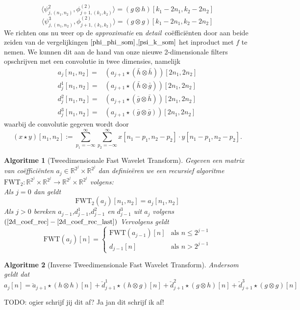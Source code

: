 \documentclass[11pt]{report}
\newcommand{\R}{\mathbb{R}}
\theoremstyle{plain}
\newtheorem*{algo}{Algoritme}
\theoremstyle{remark}
\newcommand{\inpr}[2]{\langle #1 , #2 \rangle}
\begin{document}
\[
\inpr{\psi^2_{j,(n_1,n_2)}}{\phi^{(2)}_{j+1,(k_1,k_2)}} = (g\otimes h) [k_1-2n_1,k_2-2n_2]
\]
\[
\inpr{\psi^3_{j,(n_1,n_2)}}{\phi^{(2)}_{j+1,(k_1,k_2)}} = (g\otimes g) [k_1-2n_1,k_2-2n_2]
\]
We richten ons nu weer op de \emph{approximatie} en \emph{detail}~co\"effici\"enten door
aan beide zeiden van de vergelijkingen $\ref{phi_phi_som}$,$\ref{psi_k_som}$ het inproduct
met $f$ te nemen. We kunnen dit aan de hand van onze nieuwe 2-dimensionale filters
opschrijven met een convolutie in twee dimensies, namelijk
\begin{eqnarray}
\label{2d_coef_rec}
	a_{j}[n_1,n_2] =& (a_{j+1} \star (\bar{h} \otimes \bar{h}))[2n_1,2n_2] \\
	d^1_{j}[n_1,n_2] =&( a_{j+1} \star (\bar{h} \otimes \bar{g}))[2n_1,2n_2] \\
	d^2_{j}[n_1,n_2] =& (a_{j+1} \star (\bar{g} \otimes \bar{h}))[2n_1,2n_2] \\
\label{2d_coef_rec_last}
	d^3_{j}[n_1,n_2] =& (a_{j+1} \star (\bar{g} \otimes \bar{g}))[2n_1,2n_2]
\end{eqnarray}
waarbij de convolutie gegeven wordt door
\[
	(x \star y)[n_1,n_2] := \sum_{p_1=-\infty}^\infty \sum_{p_2 = -\infty}^\infty 
        x[n_1 - p_1,n_2 - p_2] \cdot y[n_1-p_1, n_2 - p_2].
\]


\begin{algo}[Tweedimensionale Fast Wavelet Transform]
Gegeven een matrix van co\"effici\"enten $a_j\in\R^{2^j}\times\R^{2^j}$ dan definie\"eren 
we een recursief algoritme $\textrm{FWT}_2:\R^{2^j}\times\R^{2^j}\to\R^{2^j}\times\R^{2^j}$ 
volgens:\\
Als $j=0$ dan geldt
\[
\textrm{FWT}_2(a_j)[n_1,n_2] = a_j[n_1,n_2]
\]
Als $j>0$ bereken $a_{j-1}$,$d^1_{j-1}$,$d^2_{j-1}$ en $d^3_{j-1}$ uit $a_{j}$ 
volgens $(\ref{2d_coef_rec}-\ref{2d_coef_rec_last})$
Vervolgens geldt
\[
\textrm{FWT}(a_j)[n] = \begin{cases} 
\textrm{FWT}(a_{j-1})[n] & \text{als } n\leq 2^{j-1} \\
d_{j-1}[n] & \text{als } n>2^{j-1} \end{cases}
\]
\end{algo}
\begin{algo}[Inverse Tweedimensionale Fast Wavelet Transform]
Andersom geldt dat
\[
a_j[n] = \breve{a}_{j+1} \star (h \otimes h)[n] + \breve{d}_{j+1}^1 \star (h \otimes g)[n] + \breve{d}_{j+1}^2 \star (g \otimes h)[n] + \breve{d}_{j+1}^3 \star (g \otimes g)[n]
\]
\end{algo}

TODO: ogier schrijf jij dit af? Ja jan dit schrijf ik af!
\end{document}
